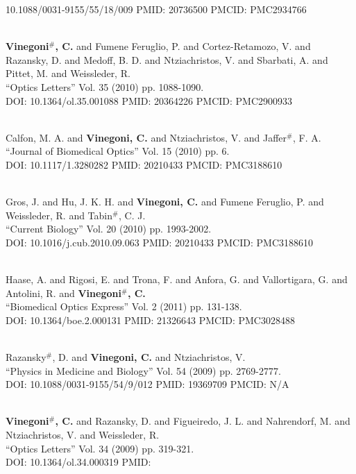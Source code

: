 10.1088/0031-9155/55/18/009 PMID: 20736500 PMCID: PMC2934766\item {} \\ {\bf Vinegoni$^\#$, C.} and Fumene Feruglio, P. and Cortez-Retamozo, V. and Razansky, D. and Medoff, B. D. and Ntziachristos, V. and Sbarbati, A. and Pittet, M. and Weissleder, R. \\ ``Optics Letters'' Vol. 35 (2010) pp. 1088-1090. \\ DOI: 10.1364/ol.35.001088 PMID: 20364226 PMCID: PMC2900933\item {} \\ Calfon, M. A. and {\bf Vinegoni, C.} and Ntziachristos, V. and Jaffer$^\#$, F. A. \\ ``Journal of Biomedical Optics'' Vol. 15 (2010) pp. 6. \\ DOI: 10.1117/1.3280282 PMID: 20210433 PMCID: PMC3188610\item {} \\ Gros, J. and Hu, J. K. H. and {\bf Vinegoni, C.} and Fumene Feruglio, P. and Weissleder, R. and Tabin$^\#$, C. J. \\ ``Current Biology'' Vol. 20 (2010) pp. 1993-2002. \\ DOI: 10.1016/j.cub.2010.09.063 PMID: 20210433 PMCID: PMC3188610\item {} \\ Haase, A. and Rigosi, E. and Trona, F. and Anfora, G. and Vallortigara, G. and Antolini, R. and {\bf Vinegoni$^\#$, C.} \\ ``Biomedical Optics Express'' Vol. 2 (2011) pp. 131-138. \\ DOI: 10.1364/boe.2.000131 PMID: 21326643 PMCID: PMC3028488\item {} \\ Razansky$^\#$, D. and {\bf Vinegoni, C.} and Ntziachristos, V. \\ ``Physics in Medicine and Biology'' Vol. 54 (2009) pp. 2769-2777. \\ DOI: 10.1088/0031-9155/54/9/012 PMID: 19369709 PMCID: N/A\item {} \\ {\bf Vinegoni$^\#$, C.} and Razansky, D. and Figueiredo, J. L. and Nahrendorf, M. and Ntziachristos, V. and Weissleder, R. \\ ``Optics Letters'' Vol. 34 (2009) pp. 319-321. \\ DOI: 10.1364/ol.34.000319 PMID: 